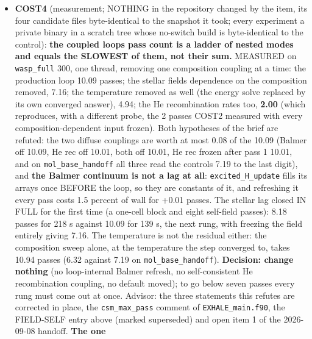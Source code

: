 \documentclass[english,a4paper]{my_memo}
\begin{document}
\begin{itemize}
  gives up at radius 3.8e-16 after 12 ray-test refusals while the merit is
  still falling): item B5e. Also recorded: \texttt{carrier\_row\_term\_scale} has the
  same collapsing structure and was not measured (no carrier row in that
  case); the trace-metal case of the floor is covered by inspection only.
\item
  \textbf{COST4} (measurement; NOTHING in the repository changed by the item, its
  four candidate files byte-identical to the snapshot it took; every
  experiment a private binary in a scratch tree whose no-switch build is
  byte-identical to the control): \textbf{the coupled loop\textquotesingle s pass count is a
  ladder of nested modes and equals the SLOWEST of them, not their sum.}
  MEASURED on \texttt{wasp\_full} 300, one thread, removing one composition coupling
  at a time: the production loop 10.09 passes; the stellar field\textquotesingle s
  dependence on the composition removed, 7.16; the temperature removed as
  well (the energy solve replaced by its own converged answer), 4.94; the He
  recombination rates too, \textbf{2.00} (which reproduces, with a different
  probe, the 2 passes COST2 measured with every composition-dependent input
  frozen). Both hypotheses of the brief are refuted: the two diffuse
  couplings are worth at most 0.08 of the 10.09 (Balmer off 10.09, He rec
  off 10.01, both off 10.01, He rec frozen after pass 1 10.01, and on
  \texttt{mol\_base\_handoff} all three read the control\textquotesingle s 7.19 to the last digit),
  and \textbf{the Balmer continuum is not a lag at all}: \texttt{excited\_H\_update} fills
  its arrays once BEFORE the loop, so they are constants of it, and
  refreshing it every pass costs 1.5 percent of wall for +0.01 passes. The
  stellar lag closed IN FULL for the first time (a one-cell block and eight
  self-field passes): 8.18 passes for 218 s against 10.09 for 139 s, the
  next rung, with freezing the field entirely giving 7.16. The temperature
  is not the residual either: the composition sweep alone, at the
  temperature the step converged to, takes 10.94 passes (6.32 against 7.19
  on \texttt{mol\_base\_handoff}). \textbf{Decision: change nothing} (no loop-internal
  Balmer refresh, no self-consistent He recombination coupling, no default
  moved); to go below seven passes every rung must come out at once.
  Advisor: the three statements this refutes are corrected in place, the
  \texttt{csm\_max\_pass} comment of \texttt{EXHALE\_main.f90}, the FIELD-SELF entry above
  (marked superseded) and open item 1 of the 2026-09-08 handoff. \textbf{The one
}
\end{itemize}
\end{document}
